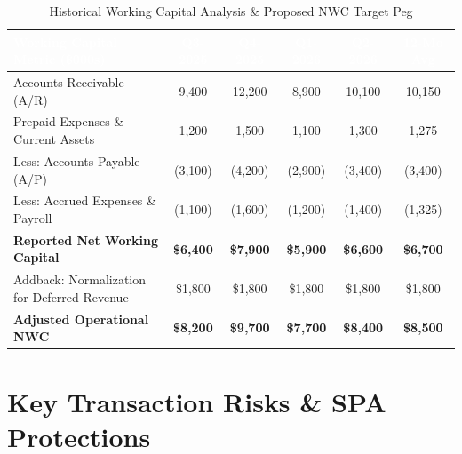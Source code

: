 \documentclass[10pt,a4paper,oneside]{scrreprt}
\newcommand{\tablehdr}[1]{\fontseries{b}\selectfont\textcolor{white}{#1}}
\begin{document}
\begin{table}[H]
\centering
\fontsize{8.2}{10}\selectfont
\renewcommand{\arraystretch}{1.0}
\begin{tabularx}{\textwidth}{L C C C C C}
\hline
{}
\tablehdr{Working Capital Metric (\$000s)} & \tablehdr{Q3-2025} & \tablehdr{Q4-2025} & \tablehdr{Q1-2026} & \tablehdr{Q2-2026} & \tablehdr{12-Mo Avg} \\
\hline
Accounts Receivable (A/R) & 9,400 & 12,200 & 8,900 & 10,100 & 10,150 \\
Prepaid Expenses \& Current Assets & 1,200 & 1,500 & 1,100 & 1,300 & 1,275 \\
Less: Accounts Payable (A/P) & (3,100) & (4,200) & (2,900) & (3,400) & (3,400) \\
Less: Accrued Expenses \& Payroll & (1,100) & (1,600) & (1,200) & (1,400) & (1,325) \\
\hline
{}
\textbf{Reported Net Working Capital} & \textbf{\$6,400} & \textbf{\$7,900} & \textbf{\$5,900} & \textbf{\$6,600} & \textbf{\$6,700} \\
\hline
Addback: Normalization for Deferred Revenue & \$1,800 & \$1,800 & \$1,800 & \$1,800 & \$1,800 \\
\hline
{}
\textbf{Adjusted Operational NWC} & \textbf{\$8,200} & \textbf{\$9,700} & \textbf{\$7,700} & \textbf{\$8,400} & \textbf{\$8,500} \\
\hline
\end{tabularx}
\caption{Historical Working Capital Analysis \& Proposed NWC Target Peg}
\end{table}

\vspace{-0.1cm}

\chapter{Key Transaction Risks \& SPA Protections}
\end{document}
